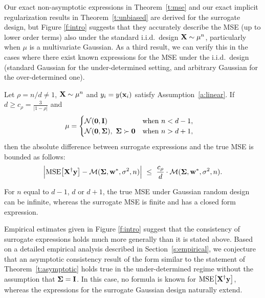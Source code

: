 \documentclass[11pt]{article}
\begin{document}
Our exact non-asymptotic expressions in Theorem~\ref{t:mse} and 
our exact implicit regularization results in Theorem~\ref{t:unbiased}
are derived for the surrogate design, but Figure \ref{f:intro}
suggests that they accurately describe the MSE (up to lower order
terms) also under the standard i.i.d.~design $\mathbf X\sim\mu^n$,
particularly when $\mu$ is a multivariate Gaussian.  
As a third result, we can verify this in the cases where there exist
known expressions for the MSE under the i.i.d.~design (standard
Gaussian for the under-determined setting, and 
arbitrary Gaussian for the over-determined one).
\begin{theorem}
\label{t:asymptotic}
Let $\rho=n/d\neq 1$, $\mathbf X\sim \mu^n$
and $y_i=y(\mathbf x_i)$ satisfy Assumption~\ref{a:linear}. If $d\geq
c_\rho=\frac3{|1-\rho|}$ and
\begin{align*}
  \mu &= \begin{cases}
    \mathcal{N}(\mathbf 0,\mathbf I)&\text{when }n<d-1,\\
    \mathcal{N}(\mathbf 0,\mathbf{\Sigma}),\ \mathbf{\Sigma}\succ\mathbf 0 &\text{when }n>d+1,
  \end{cases}
\end{align*}
then the absolute difference between surrogate
expressions and the true MSE is bounded as follows:
\begin{align*}
\Big|{\mathrm{MSE}\big[\mathbf X^\dagger\mathbf y\big]}-\mathcal M(\mathbf{\Sigma}, \mathbf w^*,\sigma^2,n)\Big|\ \leq\
\frac{c_\rho}{d} \cdot \mathcal M(\mathbf{\Sigma},\mathbf w^*,\sigma^2,n).
\end{align*}
\end{theorem}
\begin{remark}
For $n$ equal to $d-1$, $d$ or $d+1$, the true MSE under Gaussian
random design can be infinite, whereas the
surrogate MSE is finite and has a closed form expression.
\end{remark}

\noindent
Empirical estimates given in Figure \ref{f:intro} suggest that the
consistency of surrogate expressions holds much more generally than
it is stated above. Based on a detailed empirical analysis described in
Section~\ref{s:empirical}, we conjecture that an asymptotic consistency
result of the form similar to the statement of Theorem~\ref{t:asymptotic}
holds true in the under-determined regime without the assumption that
$\mathbf{\Sigma}=\mathbf I$. In this case, no formula is known for
${\mathrm{MSE}\big[\mathbf X^\dagger\mathbf y\big]}$, whereas the expressions for the surrogate
Gaussian design naturally extend.  
\end{document}
